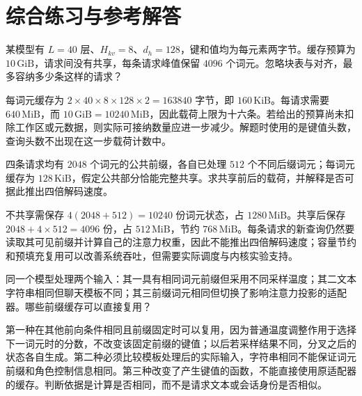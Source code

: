 \documentclass[UTF8,12pt,a4paper,fontset=fandol]{ctexart}
\begin{document}
\section{综合练习与参考解答}
\label{sec:kv-exercises}

\begin{example}[由容量倒推并发预算]
某模型有 $L=40$ 层、$H_{kv}=8$、$d_h=128$，键和值均为每元素两字节。缓存预算为 $10\,\mathrm{GiB}$，请求间没有共享，每条请求峰值保留 $4096$ 个词元。忽略块表与对齐，最多容纳多少条这样的请求？
\end{example}
\begin{solve}
每词元缓存为 $2\times40\times8\times128\times2=163840$ 字节，即 $160\,\mathrm{KiB}$。每请求需要 $640\,\mathrm{MiB}$，而 $10\,\mathrm{GiB}=10240\,\mathrm{MiB}$，因此载荷上限为十六条。若给出的预算尚未扣除工作区或元数据，则实际可接纳数量应进一步减少。解题时使用的是键值头数，查询头数不出现在这一步载荷计数中。
\end{solve}

\begin{example}[前缀共享节约了什么]
四条请求均有 $2048$ 个词元的公共前缀，各自已处理 $512$ 个不同后缀词元；每词元缓存为 $128\,\mathrm{KiB}$，假定公共部分恰能完整共享。求共享前后的载荷，并解释是否可据此推出四倍解码速度。
\end{example}
\begin{solve}
不共享需保存 $4(2048+512)=10240$ 份词元状态，占 $1280\,\mathrm{MiB}$。共享后保存 $2048+4\times512=4096$ 份，占 $512\,\mathrm{MiB}$，节约 $768\,\mathrm{MiB}$。每条请求的新查询仍然要读取其可见前缀并计算自己的注意力权重，因此不能推出四倍解码速度；容量节约和预填充复用可以改善系统吞吐，但需要实际调度与内核实验支持。
\end{solve}

\begin{example}[判断三种复用是否合法]
同一个模型处理两个输入：其一具有相同词元前缀但采用不同采样温度；其二文本字符串相同但聊天模板不同；其三前缀词元相同但切换了影响注意力投影的适配器。哪些前缀缓存可以直接复用？
\end{example}
\begin{solve}
第一种在其他前向条件相同且前缀固定时可以复用，因为普通温度调整作用于选择下一词元时的分数，不改变该固定前缀的键值；以后若采样结果不同，分叉之后的状态各自生成。第二种必须比较模板处理后的实际输入，字符串相同不能保证词元前缀和角色控制信息相同。第三种改变了产生键值的函数，不能直接使用原适配器的缓存。判断依据是计算是否相同，而不是请求文本或会话身份是否相似。
\end{solve}
\end{document}
